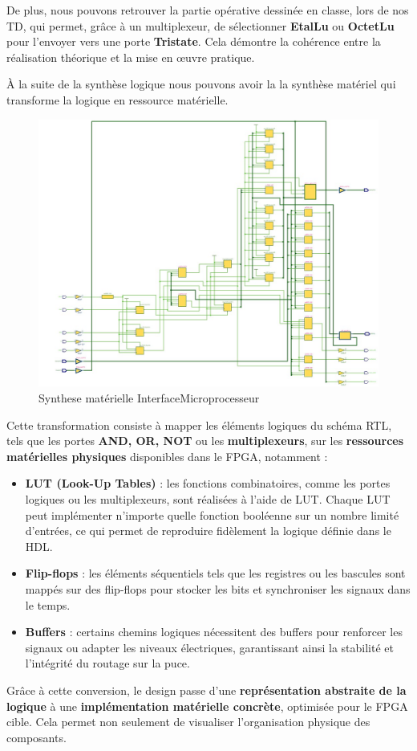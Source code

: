 De plus, nous pouvons retrouver la partie opérative dessinée en classe, lors de nos TD, qui permet, 
grâce à un multiplexeur, de sélectionner \textbf{EtalLu} ou \textbf{OctetLu} pour l'envoyer vers 
une porte \textbf{Tristate}.  
Cela démontre la cohérence entre la réalisation théorique et la mise en œuvre pratique.
\newline

À la suite de la synthèse logique nous pouvons avoir la la synthèse matériel qui transforme la 
logique en ressource matérielle.

\begin{figure}[H]
    \centering
    \includegraphics[width=0.9\linewidth]{images/Synthe/RTL_HARD_HDL.jpg}
    \caption{Synthese matérielle InterfaceMicroprocesseur}
    \label{fig:placeholder}
\end{figure}

Cette transformation consiste à mapper les éléments logiques du schéma RTL, tels que les portes 
\textbf{ AND, OR, NOT} ou les \textbf{multiplexeurs}, sur les \textbf{ressources matérielles 
physiques} disponibles dans le FPGA, notamment :  
\newline

\begin{itemize}
    \item \textbf{LUT (Look-Up Tables)} : les fonctions combinatoires, comme les portes logiques ou les multiplexeurs, sont réalisées à l’aide de LUT. Chaque LUT peut implémenter n’importe quelle fonction booléenne sur un nombre limité d’entrées, ce qui permet de reproduire fidèlement la logique définie dans le HDL.
    \item \textbf{Flip-flops} : les éléments séquentiels tels que les registres ou les bascules sont mappés sur des flip-flops pour stocker les bits et synchroniser les signaux dans le temps.
    \item \textbf{Buffers} : certains chemins logiques nécessitent des buffers pour renforcer les signaux ou adapter les niveaux électriques, garantissant ainsi la stabilité et l’intégrité du routage sur la puce.
\end{itemize}

Grâce à cette conversion, le design passe d’une \textbf{représentation abstraite de la logique} à une \textbf{implémentation matérielle concrète}, optimisée pour le FPGA cible. Cela permet non seulement de visualiser l’organisation physique des composants.
\newline